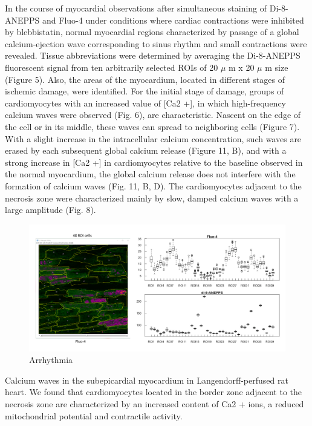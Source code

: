 \documentclass[a4paper,12pt]{article}
\begin{document}
In the course of myocardial observations after simultaneous staining of Di-8-ANEPPS and Fluo-4 under conditions where cardiac contractions were inhibited by blebbistatin, normal myocardial regions characterized by passage of a global calcium-ejection wave corresponding to sinus rhythm and small contractions were revealed. Tissue abbreviations were determined by averaging the Di-8-ANEPPS fluorescent signal from ten arbitrarily selected ROIs of 20 $\mu$ m x 20 $\mu$ m size (Figure 5). Also, the areas of the myocardium, located in different stages of ischemic damage, were identified. For the initial stage of damage, groups of cardiomyocytes with an increased value of [Ca2 +], in which high-frequency calcium waves were observed (Fig. 6), are characteristic. Nascent on the edge of the cell or in its middle, these waves can spread to neighboring cells (Figure 7). With a slight increase in the intracellular calcium concentration, such waves are erased by each subsequent global calcium release (Figure 11, B), and with a strong increase in [Ca2 +] in cardiomyocytes relative to the baseline observed in the normal myocardium, the global calcium release does not interfere with the formation of calcium waves (Fig. 11, B, D). The cardiomyocytes adjacent to the necrosis zone were characterized mainly by slow, damped calcium waves with a large amplitude (Fig. 8).

\begin{figure}
    \includegraphics[width=\linewidth]{fig3.png}
    \caption{Arrhythmia}
    \label{fig:fig3}
\end{figure}

Calcium waves in the subepicardial myocardium in Langendorff-perfused rat heart.
We found that cardiomyocytes located in the border zone adjacent to the necrosis zone are characterized by an increased content of Ca2 + ions, a reduced mitochondrial potential and contractile activity.
\end{document}
